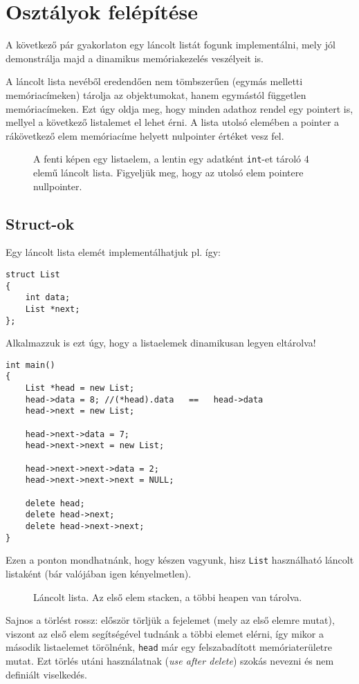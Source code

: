 \documentclass[../cpp_book/cpp_book.tex]{subfiles}
\begin{document}
	\section{Osztályok felépítése}
	A következő pár gyakorlaton egy láncolt listát fogunk implementálni, mely jól demonstrálja majd a dinamikus memóriakezelés veszélyeit is.
	
	\smallskip
	A láncolt lista nevéből eredendően nem tömbszerűen (egymás melletti memóriacímeken) tárolja az objektumokat, hanem egymástól független memóriacímeken. Ezt úgy oldja meg, hogy minden adathoz rendel egy pointert is, mellyel a következő listalemet el lehet érni. A lista utolsó elemében a pointer a rákövetkező elem memóriacíme helyett nulpointer értéket vesz fel.
	\begin{figure}[H]
		\centering
		
		\caption{A fenti képen egy listaelem, a lentin egy adatként \texttt{int}-et tároló 4 elemű láncolt lista. Figyeljük meg, hogy az utolsó elem pointere nullpointer.}\label{fig_list-example}
	\end{figure}
	\subsection{Struct-ok}
	Egy láncolt lista elemét implementálhatjuk pl. így:
	\begin{lstlisting}
struct List
{
	int data;
	List *next;
};
	\end{lstlisting}
	Alkalmazzuk is ezt úgy, hogy  a listaelemek dinamikusan legyen eltárolva!
	\begin{lstlisting}
int main()
{
	List *head = new List;
	head->data = 8; //(*head).data   ==   head->data
	head->next = new List;
	
	head->next->data = 7;
	head->next->next = new List;
	
	head->next->next->data = 2;
	head->next->next->next = NULL;
	
	delete head;
	delete head->next;
	delete head->next->next;
}
	\end{lstlisting}
	Ezen a ponton mondhatnánk, hogy készen vagyunk, hisz \texttt{List} használható láncolt listaként (bár valójában igen kényelmetlen).
	\medskip
	
	\begin{figure}[!h]
		\centering
		
		\caption{Láncolt lista. Az első elem stacken, a többi heapen van tárolva.}
	\end{figure}
	Sajnos a törlést rossz: először törljük a fejelemet (mely az első elemre mutat), viszont az első elem segítségével tudnánk a többi elemet elérni, így mikor a második listaelemet törölnénk, \texttt{head} már egy felszabadított memóriaterületre mutat. Ezt törlés utáni használatnak (\textit{use after delete}) szokás nevezni és nem definiált viselkedés.
	
\end{document}
